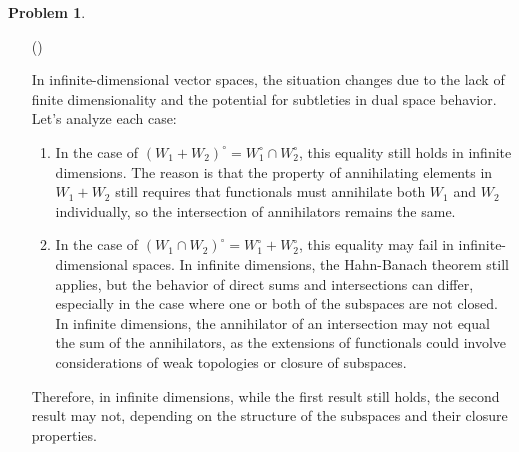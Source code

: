 \documentclass[12pt]{article}
\theoremstyle{definition}
\newtheorem{problem}{Problem}
\newcounter{subq}[problem]
\newenvironment{subproblem}
{\refstepcounter{subq} \begin{itemize} \item[(\alph{subq})]}
{\end{itemize} \medskip}
\begin{document}
\begin{problem}
\begin{subproblem}
        \begin{solution}
            In infinite-dimensional vector spaces, the situation changes due to the lack of finite dimensionality and the potential for subtleties in dual space behavior. Let's analyze each case:

            \begin{enumerate}
                \item In the case of $(W_1 + W_2)^\circ = W_1^\circ \cap W_2^\circ$, this equality still holds in infinite dimensions. The reason is that the property of annihilating elements in $W_1 + W_2$ still requires that functionals must annihilate both $W_1$ and $W_2$ individually, so the intersection of annihilators remains the same.

                \item In the case of $(W_1 \cap W_2)^\circ = W_1^\circ + W_2^\circ$, this equality may fail in infinite-dimensional spaces. In infinite dimensions, the Hahn-Banach theorem still applies, but the behavior of direct sums and intersections can differ, especially in the case where one or both of the subspaces are not closed. In infinite dimensions, the annihilator of an intersection may not equal the sum of the annihilators, as the extensions of functionals could involve considerations of weak topologies or closure of subspaces.
            \end{enumerate}
            
            Therefore, in infinite dimensions, while the first result still holds, the second result may not, depending on the structure of the subspaces and their closure properties.
        \end{solution}
    \end{subproblem}
\end{problem}
\end{document}
